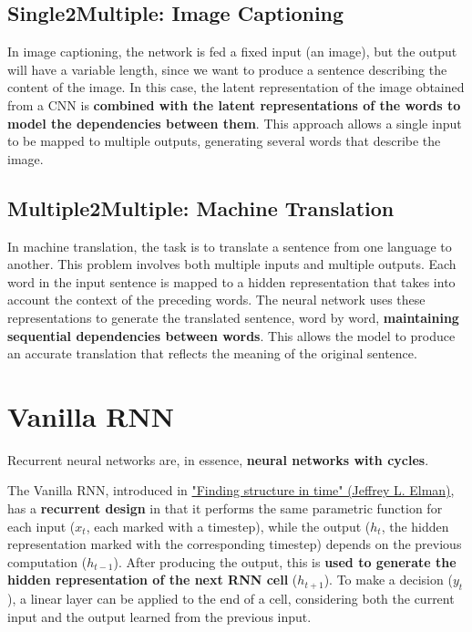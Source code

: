 \subsection{Single2Multiple: Image Captioning}

In image captioning, the network is fed a fixed input (an image), but the output will have a variable length, since we want to produce a sentence describing the content of the image. In this case, the latent representation of the image obtained from a CNN is \textbf{combined with the latent representations of the words to model the dependencies between them}. This approach allows a single input to be mapped to multiple outputs, generating several words that describe the image.

\subsection{Multiple2Multiple: Machine Translation}

In machine translation, the task is to translate a sentence from one language to another. This problem involves both multiple inputs and multiple outputs. Each word in the input sentence is mapped to a hidden representation that takes into account the context of the preceding words. The neural network uses these representations to generate the translated sentence, word by word, \textbf{maintaining sequential dependencies between words}. This allows the model to produce an accurate translation that reflects the meaning of the original sentence.

\section{Vanilla RNN}

Recurrent neural networks are, in essence, \textbf{neural networks with cycles}.

The Vanilla RNN, introduced in \href{https://www.sciencedirect.com/science/article/pii/036402139090002E}{"Finding structure in time" (Jeffrey L. Elman)}, has a \textbf{recurrent design} in that it performs the same parametric function for each input ($x_t$, each marked with a timestep), while the output ($h_t$, the hidden representation marked with the corresponding timestep) depends on the previous computation ($h_{t-1}$). After producing the output, this is \textbf{used to generate the hidden representation of the next RNN cell} ($h_{t+1}$). To make a decision ($y_t$), a linear layer can be applied to the end of a cell, considering both the current input and the output learned from the previous input.

